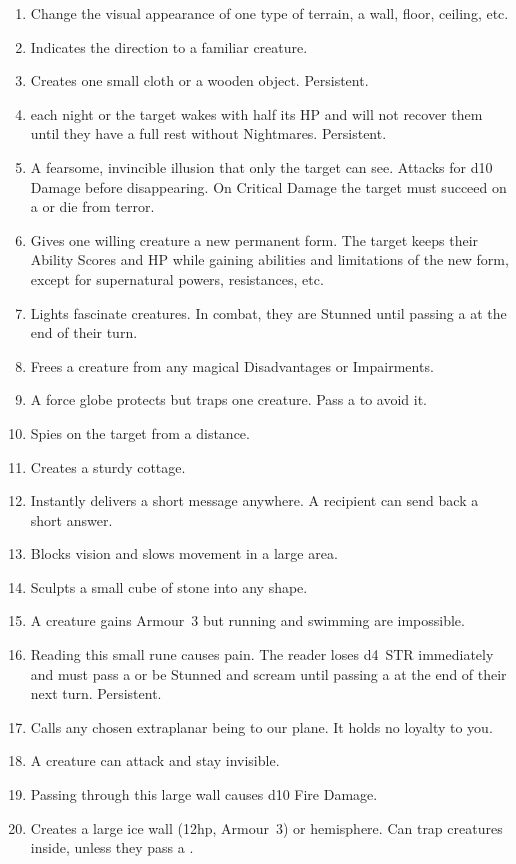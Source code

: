\documentclass[itdr]{subfiles}
\begin{document}
\begin{enumerate}
	\item {} Change the visual appearance of one type of terrain, a wall, floor, ceiling, etc.
	\item {} Indicates the direction to a familiar creature.
	\item {} Creates one small cloth or a wooden object. Persistent.
	\vfill
	\break
	\item {}  each night or the target wakes with half its HP and will not recover them until they have a full rest without Nightmares. Persistent.
	\item {} A fearsome, invincible illusion that only the target can see. Attacks for d10 Damage before disappearing. On Critical Damage the target must succeed on a  or die from terror.
	\item {} Gives one willing creature a new permanent form. The target keeps their Ability Scores and HP while gaining abilities and limitations of the new form, except for supernatural powers, resistances, etc.
	\item {} Lights fascinate creatures. In combat, they are Stunned until passing a  at the end of their turn.
	\item {} Frees a creature from any magical Disadvantages or Impairments.
	\item {} A force globe protects but traps one creature. Pass a  to avoid it.
	\item {} Spies on the target from a distance.
	\item {} Creates a sturdy cottage.
	\item {} Instantly delivers a short message anywhere. A recipient can send back a short \mbox{answer}.
	\item {} Blocks vision and slows movement in a large area.
	\item {} Sculpts a small cube of stone into any shape.
	\item {} A creature gains Armour~3 but running and swimming are impossible.
	\item {} Reading this small rune causes pain. The reader loses d4~STR immediately and must pass a  or be Stunned and scream until passing a  at the end of their next turn. Persistent.
	\item {} Calls any chosen extraplanar being to our plane. It holds no loyalty to you.
	\item {} A creature can attack and stay invisible.
	\item {} Passing through this large wall causes d10 Fire Damage.
	\item {} Creates a large ice wall (12hp, Armour~3) or hemisphere. Can trap creatures inside, unless they pass a .
\end{enumerate}
\end{document}

